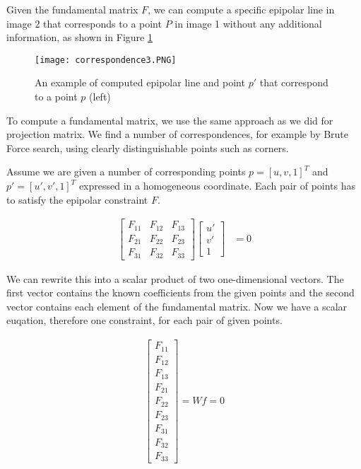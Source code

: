 \documentclass[twoside]{article}
\begin{document}
Given the fundamental matrix $F$, we can compute a specific epipolar line in image 2 that corresponds to a point $P$ in image 1 without any additional information, as shown in Figure \ref{ex2}

\begin{figure}[h!]
  \begin{center}
	\texttt{[image: correspondence3.PNG]}  \end{center}
  \caption{An example of computed epipolar line and point $p'$ that correspond to a point $p$ (left)}
  \label{ex2}
\end{figure}

To compute a fundamental matrix, we use the same approach as we did for projection matrix. We find a number of correspondences, for example by Brute Force search, using clearly distinguishable points such as corners.

Assume we are given a number of corresponding points $p = [u, v, 1]^T$ and $p'= [u',v',1]^T$ expressed in a homogeneous coordinate. Each pair of points has to satisfy the epipolar constraint $F$.

\begin{align}
[u, v, 1] \begin{bmatrix}
F_{11} & F_{12} & F_{13} \\
F_{21} & F_{22} & F_{23} \\
F_{31} & F_{32} & F_{33}
\end{bmatrix} \begin{bmatrix}
u' \\ v' \\ 1
\end{bmatrix} &= 0
\end{align}

We can rewrite this into a scalar product of two one-dimensional vectors. The first vector contains the known coefficients from the given points and the second vector contains each element of the fundamental matrix. Now we have a scalar euqation, therefore one constraint, for each pair of given points.

\begin{align}
[uu', uv', u, vu', vv', v, u', v', 1]\begin{bmatrix}
F_{11} \\F_{12} \\F_{13} \\F_{21} \\F_{22} \\F_{23} \\F_{31} \\F_{32} \\F_{33}
\end{bmatrix} = Wf = 0
\end{align}
\end{document}
